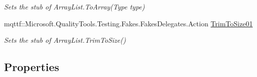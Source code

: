 \begin{DoxyCompactItemize}
\begin{DoxyCompactList}\small\item\em Sets the stub of Array\-List.\-To\-Array(\-Type type)\end{DoxyCompactList}\item 
mqttf\-::\-Microsoft.\-Quality\-Tools.\-Testing.\-Fakes.\-Fakes\-Delegates.\-Action \hyperlink{class_system_1_1_collections_1_1_fakes_1_1_stub_array_list_aa47a51b80cc7c4740e3e243038df673d}{Trim\-To\-Size01}
\begin{DoxyCompactList}\small\item\em Sets the stub of Array\-List.\-Trim\-To\-Size()\end{DoxyCompactList}\end{DoxyCompactItemize}
\subsection*{Properties}
